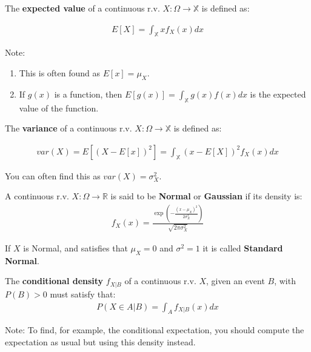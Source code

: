 \documentclass[aspectratio=169]{beamer}
\begin{document}
\begin{frame}
    \begin{definition}
        The \textbf{expected value} of a continuous r.v. $X:\Omega\rightarrow\mathbb{X}$ is defined as:
        
        \begin{align*}
            E[X]=\int_{\mathbb{X}}xf_X(x)dx
        \end{align*}
    \end{definition}
    
    Note:
    \begin{enumerate}
        \item This is often found as $E[x]=\mu_X$.
        \item If $g(x)$ is a function, then $E[g(x)]=\int_\mathbb{X} g(x)f(x)dx$ is the expected value of the function.
    \end{enumerate}
\end{frame}

\begin{frame}
    \begin{definition}
        The \textbf{variance} of a continuous r.v. $X:\Omega\rightarrow\mathbb{X}$ is defined as:
        
        \begin{align*}
            var(X)=E[(X-E[x])^2]=\int_{\mathbb{X}}(x-E[X])^2f_X(x)dx
        \end{align*}
    \end{definition}
    
    You can often find this as $var(X)=\sigma_X^2$.
\end{frame}

\begin{frame}
 \begin{definition}
    A continuous r.v. $X:\Omega\rightarrow\mathbb{R}$ is said to be \textbf{Normal} or \textbf{Gaussian} if its density is:
    \begin{align*}
        f_X(x)= \frac{\exp({-\frac{(x-\mu_X)^2}{2\sigma_X^2}})}{\sqrt{2\pi\sigma_X^2}}
    \end{align*}
 \end{definition}
 
    \begin{definition}
        If $X$ is Normal, and satisfies that $\mu_X=0$ and $\sigma^2=1$ it is called \textbf{Standard Normal}. 
    \end{definition}
\end{frame}

\begin{frame}

    \begin{definition}
    The \textbf{conditional density} $f_{X|B}$ of a continuous r.v. $X$, given an event $B$, with $P(B)>0$ must satisfy that:
    \begin{align*}
        P(X\in A|B)=\int_{A}f_{X|B}(x)dx
    \end{align*}
    \end{definition}
    
    Note: To find, for example, the conditional expectation, you should compute the expectation as usual but using this density instead.
\end{frame}
\end{document}
